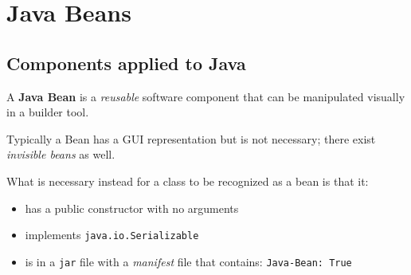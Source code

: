\chapter{Java Beans}
\section{Components applied to Java}
\begin{definition}
    A \textbf{Java Bean} is a \textit{reusable} software component that can be manipulated visually in a builder tool.
\end{definition}

Typically a Bean has a GUI representation but is not necessary; there exist \textit{invisible beans} as well.
{What is necessary instead for a class to be recognized as a bean is that it:\ns
\begin{itemize}
    \item has a public constructor with no arguments
    \item implements \lstinline{java.io.Serializable}
    \item is in a \lstinline{jar} file with a \textit{manifest} file that contains: \lstinline{Java-Bean: True}
\end{itemize}}

